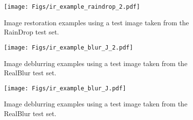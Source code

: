 \vspace{0.5cm}

\begin{figure}[!tp]
    \centering
    \texttt{[image: Figs/ir\_example\_raindrop\_2.pdf]}
    \caption{Image restoration examples using a test image taken from the RainDrop test set.} 
\label{fig: ir example raindrop 2}
\end{figure}

\vspace{0.5cm}

\begin{figure}[!tp]
    \centering
    \texttt{[image: Figs/ir\_example\_blur\_J\_2.pdf]}
    \caption{Image deblurring examples using a test image taken from the RealBlur test set.} 
\label{fig: ir example blur j}
\end{figure}

\vspace{0.5cm}

\begin{figure}[!tp]
    \centering
    \texttt{[image: Figs/ir\_example\_blur\_J.pdf]}
    \caption{Image deblurring examples using a test image taken from the RealBlur test set.} 
\label{fig: ir example blur j 2}
\end{figure}

